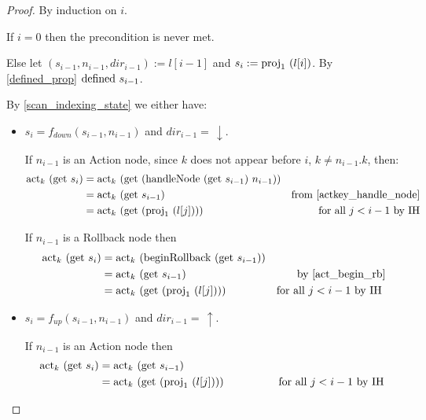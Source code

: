 \documentclass{article}
\newcommand{\textfun}[1]{\textup{#1}}
\newcommand{\fdown}[2]{\ensuremath{f_{down}(#1, #2)}}
\newcommand{\fup}[2]{\ensuremath{f_{up}(#1, #2)}}
\newcommand{\up}{\uparrow}
\newcommand{\down}{\downarrow}
\newcommand{\hNode}[2]{\textfun{handleNode}\ #1\ #2}
\newcommand{\beginRb}[1]{\textfun{beginRollback}\ #1}
\newcommand{\defined}[1]{\textfun{defined}\ #1}
\newcommand{\get}[1]{\textfun{get}\ #1}
\newcommand{\fst}[1]{\textfun{proj}_1\ #1}
\newcommand{\actkey}[2]{\textfun{act}_{#1}\ #2}
\begin{document}
\begin{proof}
    By induction on $i$.

    If $i = 0$ then the precondition is never met.

    Else let $(s_{i -1}, n_{i - 1}, dir_{i - 1}) := l[i - 1]$ and $s_i := \fst{(l[i])}$. By \cref{defined_prop} $\defined{s_{i - 1}}$.

    By \cref{scan_indexing_state} we either have:
    \begin{itemize}
        \item $s_i = \fdown{s_{i - 1}}{n_{i - 1}}$ and $dir_{i - 1} =\, \down$.
        
            If $n_{i - 1}$ is an Action node, since $k$ does not appear before $i$, $k \neq n_{i - 1}.k$, then:
        \begin{align*}
            \actkey{k}{(\get{s_i})} &= \actkey{k}{(\get{(\hNode{(\get{s_{i - 1}})}{n_{i - 1}})})} \\
             &= \actkey{k}{(\get{s_{i - 1}})} &\text{from \cref{actkey_handle_node}} \\
             &= \actkey{k}{(\get{(\fst{(l[j])})})} &\text{for all $j < i - 1$ by IH}
        \end{align*}

        If $n_{i - 1}$ is a Rollback node then
        \begin{align*}
            \actkey{k}{(\get{s_i})} &= \actkey{k}{(\beginRb{(\get{s_{i - 1}})})}\\
            &= \actkey{k}{(\get{s_{i - 1}})} &\text{by \cref{act_begin_rb}} \\
            &= \actkey{k}{(\get{(\fst{(l[j])})})} &\text{for all $j < i - 1$ by IH } 
        \end{align*}

        \item $s_i = \fup{s_{i - 1}}{n_{i - 1}}$ and $dir_{i - 1} =\, \up$.
        
        If $n_{i - 1}$ is an Action node then
        \begin{align*}
            \actkey{k}{(\get{s_i})} &= \actkey{k}{(\get{s_{i - 1}})} \\
            &=\actkey{k}{(\get{(\fst{(l[j])})})} &\text{\qquad  \qquad for all $j < i - 1$ by IH } 
        \end{align*}


\end{itemize}
\end{proof}
\end{document}
